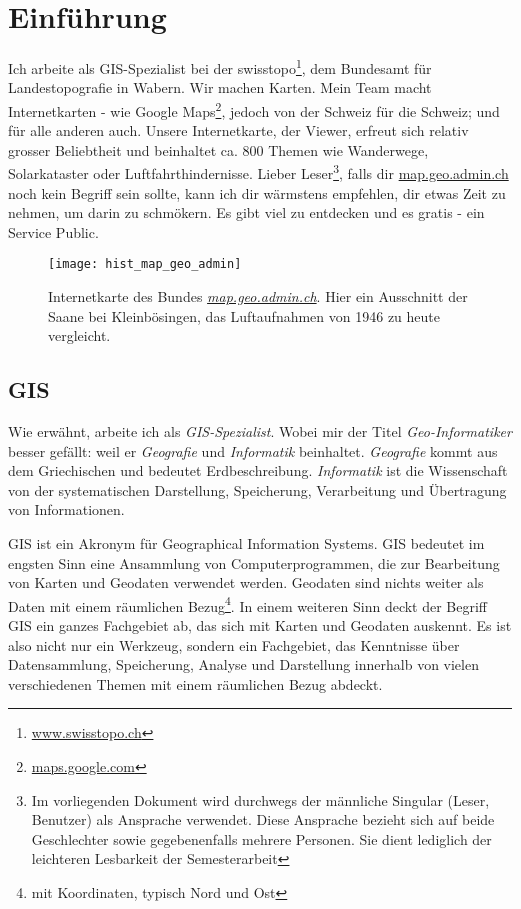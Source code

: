 \section{Einführung}
Ich arbeite als GIS-Spezialist bei der swisstopo\footnote{\href{https://www.swisstopo.ch}{www.swisstopo.ch}}, dem Bundesamt für Landestopografie in Wabern. Wir machen Karten. Mein Team macht Internetkarten - wie Google Maps\footnote{\href{https://maps.google.com}{maps.google.com}}, jedoch von der Schweiz für die Schweiz; und für alle anderen auch. Unsere Internetkarte, der Viewer, erfreut sich relativ grosser Beliebtheit
und beinhaltet ca. 800 Themen wie Wanderwege, Solarkataster oder Luftfahrthindernisse. Lieber Leser\footnote{Im vorliegenden Dokument wird durchwegs der männliche Singular (Leser, Benutzer) als Ansprache verwendet. Diese Ansprache bezieht sich auf beide Geschlechter sowie gegebenenfalls mehrere Personen. Sie dient lediglich der leichteren Lesbarkeit der Semesterarbeit}, falls dir \href{https://map.geo.admin.ch}{map.geo.admin.ch} noch kein Begriff sein sollte, kann ich dir wärmstens empfehlen, dir etwas Zeit zu nehmen, um darin zu schmökern. Es gibt viel zu entdecken und es gratis - ein Service Public.

\begin{figure}[H]
	\centering
	\texttt{[image: hist\_map\_geo\_admin]}
	\caption{Internetkarte des Bundes \emph{\href{https://s.geo.admin.ch/8a82499889}{map.geo.admin.ch}}. Hier ein Ausschnitt der Saane bei Kleinbösingen, das Luftaufnahmen von 1946 zu heute vergleicht.}
	\label{fig:map.geo.admin.ch}
\end{figure}


\subsection{GIS}
Wie erwähnt, arbeite ich als \emph{GIS-Spezialist}. Wobei mir der Titel \emph{Geo-Informatiker} besser gefällt: weil er \emph{Geografie} und \emph{Informatik} beinhaltet. \emph{Geografie} kommt aus dem Griechischen und bedeutet Erdbeschreibung. \emph{Informatik} ist die Wissenschaft von der systematischen Darstellung, Speicherung, Verarbeitung und Übertragung von Informationen.

GIS ist ein Akronym für Geographical Information Systems. GIS bedeutet im engsten Sinn eine Ansammlung von Computerprogrammen, die zur Bearbeitung von Karten und Geodaten verwendet werden. Geodaten sind nichts weiter als Daten mit einem räumlichen Bezug\footnote{mit Koordinaten, typisch Nord und Ost}. In einem weiteren Sinn deckt der Begriff GIS ein ganzes Fachgebiet ab, das sich mit Karten und Geodaten auskennt. Es ist also nicht nur ein Werkzeug, sondern ein Fachgebiet, das Kenntnisse über Datensammlung, Speicherung, Analyse und Darstellung innerhalb von vielen verschiedenen Themen mit einem räumlichen Bezug abdeckt. 

